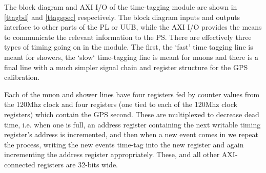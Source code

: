 The block diagram and AXI I/O of the time-tagging module are shown in \autoref{ttagbd} and \autoref{ttagspec} respectively. The block diagram inputs and outputs interface to other parts of the PL or UUB, while the AXI I/O provides the means to communicate the relevant information to the PS. There are effectively three types of timing going on in the module. The first, the `fast' time tagging line is meant for showers, the `slow` time-tagging line is meant for muons and there is a final line with a much simpler signal chain and register structure for the GPS calibration. 

Each of the muon and shower lines have four registers fed by counter values from the 120Mhz clock and four registers (one tied to each of the 120Mhz clock registers) which contain the GPS second. These are multiplexed to decrease dead time, i.e. when one is full, an address register containing the next writable timing register's address is incremented, and then when a new event comes in we repeat the process, writing the new events time-tag into the new register and again incrementing the address register appropriately. These, and all other AXI-connected registers are 32-bits wide. 

